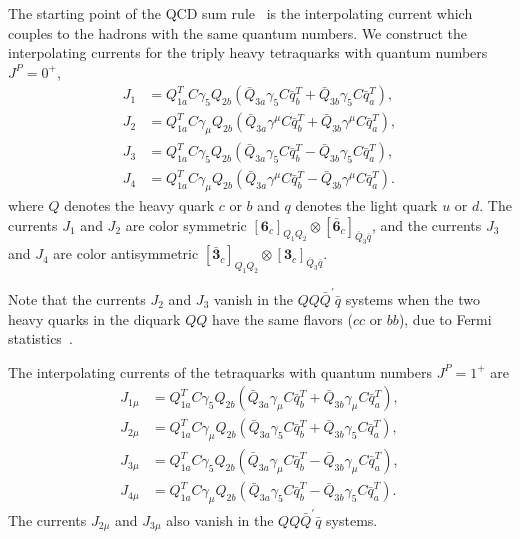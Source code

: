 \documentclass[prd,showpacs,showkeys,floatfix,amsmath,amssymb,floatfix,english]{revtex4}
\begin{document}
The starting point of the QCD sum
rule~\cite{1979-Shifman-p385-447,1985-Reinders-p1-1,2000-Colangelo-p1495-1576}
is the interpolating current which couples to the hadrons with the
same quantum numbers. We construct the interpolating currents for
the triply heavy tetraquarks with quantum numbers $J^{P}=0^{+}$,
\begin{align}
J_{1} & =Q_{1a}^{T}C\gamma_{5}Q_{2b}\left(\bar{Q}_{3a}\gamma_{5}C\bar{q}_{b}^{T}+\bar{Q}_{3b}\gamma_{5}C\bar{q}_{a}^{T}\right),\nonumber \\
J_{2} & =Q_{1a}^{T}C\gamma_{\mu}Q_{2b}\left(\bar{Q}_{3a}\gamma^{\mu}C\bar{q}_{b}^{T}+\bar{Q}_{3b}\gamma^{\mu}C\bar{q}_{a}^{T}\right), \label{currents0+}
\nonumber \\
J_{3} & =Q_{1a}^{T}C\gamma_{5}Q_{2b}\left(\bar{Q}_{3a}\gamma_{5}C\bar{q}_{b}^{T}-\bar{Q}_{3b}\gamma_{5}C\bar{q}_{a}^{T}\right),\nonumber \\
J_{4} &
=Q_{1a}^{T}C\gamma_{\mu}Q_{2b}\left(\bar{Q}_{3a}\gamma^{\mu}C\bar{q}_{b}^{T}-\bar{Q}_{3b}\gamma^{\mu}C\bar{q}_{a}^{T}\right). 
\end{align}
where $Q$ denotes the heavy quark $c$ or $b$ and $q$ denotes the
light quark $u$ or $d$. The currents $J_{1}$ and $J_{2}$ are color
symmetric
$\left[\boldsymbol{6}_{c}\right]_{Q_{1}Q_{2}}\otimes\left[\bar{\boldsymbol{6}}_{c}\right]_{\bar
Q_{3}\bar q}$, and the currents $J_{3}$ and $J_{4}$ are color
antisymmetric
$\left[\bar{\boldsymbol{3}}_{c}\right]_{Q_{1}Q_{2}}\otimes\left[\boldsymbol{3}_{c}\right]_{\bar
Q_{3}\bar q}$.

Note that the currents $J_{2}$ and $J_{3}$ vanish in the $QQ\bar
Q^{\prime}\bar q$ systems when the two heavy quarks in the diquark
$QQ$ have the same flavors ($cc$ or $bb$), due to Fermi statistics~\cite{2013-Du-p14003-14003,2014-Chen-p54037-54037}.

The interpolating currents of the tetraquarks with quantum numbers
$J^{P}=1^{+}$ are
\begin{align}
J_{1\mu} & =Q_{1a}^{T}C\gamma_{5}Q_{2b}\left(\bar{Q}_{3a}\gamma_{\mu}C\bar{q}_{b}^{T}+\bar{Q}_{3b}\gamma_{\mu}C\bar{q}_{a}^{T}\right),\nonumber \\
J_{2\mu} & =Q_{1a}^{T}C\gamma_{\mu}Q_{2b}\left(\bar{Q}_{3a}\gamma_{5}C\bar{q}_{b}^{T}+\bar{Q}_{3b}\gamma_{5}C\bar{q}_{a}^{T}\right),\nonumber \\
J_{3\mu} & =Q_{1a}^{T}C\gamma_{5}Q_{2b}\left(\bar{Q}_{3a}\gamma_{\mu}C\bar{q}_{b}^{T}-\bar{Q}_{3b}\gamma_{\mu}C\bar{q}_{a}^{T}\right),\nonumber \\
J_{4\mu} &
=Q_{1a}^{T}C\gamma_{\mu}Q_{2b}\left(\bar{Q}_{3a}\gamma_{5}C\bar{q}_{b}^{T}-\bar{Q}_{3b}\gamma_{5}C\bar{q}_{a}^{T}\right).
\end{align}
The currents $J_{2\mu}$ and $J_{3\mu}$ also vanish in the $QQ\bar
Q^{\prime}\bar q$ systems.
\end{document}
